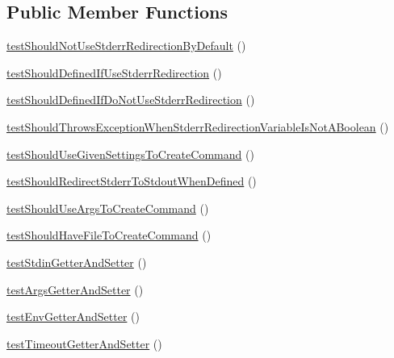 \subsection*{Public Member Functions}
\begin{DoxyCompactItemize}
\item 
\mbox{\hyperlink{class_p_h_p_unit___util___p_h_p_test_a3b801891e9faf40b0c27586909866e4a}{test\+Should\+Not\+Use\+Stderr\+Redirection\+By\+Default}} ()
\item 
\mbox{\hyperlink{class_p_h_p_unit___util___p_h_p_test_aea223b4d1c3665fe11f366b40d283409}{test\+Should\+Defined\+If\+Use\+Stderr\+Redirection}} ()
\item 
\mbox{\hyperlink{class_p_h_p_unit___util___p_h_p_test_ae2c3801c80392e94782d4aaeb6043c19}{test\+Should\+Defined\+If\+Do\+Not\+Use\+Stderr\+Redirection}} ()
\item 
\mbox{\hyperlink{class_p_h_p_unit___util___p_h_p_test_a65395e1f60ed9c20158851a3221cddc3}{test\+Should\+Throws\+Exception\+When\+Stderr\+Redirection\+Variable\+Is\+Not\+A\+Boolean}} ()
\item 
\mbox{\hyperlink{class_p_h_p_unit___util___p_h_p_test_ad56c6da33ad812176c407faaeffdc546}{test\+Should\+Use\+Given\+Settings\+To\+Create\+Command}} ()
\item 
\mbox{\hyperlink{class_p_h_p_unit___util___p_h_p_test_a25e6138b0aefb00f4d20332db2570a1a}{test\+Should\+Redirect\+Stderr\+To\+Stdout\+When\+Defined}} ()
\item 
\mbox{\hyperlink{class_p_h_p_unit___util___p_h_p_test_a722b0a91bd76acf208f1f6e796e6bf58}{test\+Should\+Use\+Args\+To\+Create\+Command}} ()
\item 
\mbox{\hyperlink{class_p_h_p_unit___util___p_h_p_test_a06d5c4b8b9087f973ab8dfe18413f7a5}{test\+Should\+Have\+File\+To\+Create\+Command}} ()
\item 
\mbox{\hyperlink{class_p_h_p_unit___util___p_h_p_test_a4b72001c3161f2940fa5c5e41e0dc106}{test\+Stdin\+Getter\+And\+Setter}} ()
\item 
\mbox{\hyperlink{class_p_h_p_unit___util___p_h_p_test_aa15e3dcd87bae69f6f8dc96b904fff8a}{test\+Args\+Getter\+And\+Setter}} ()
\item 
\mbox{\hyperlink{class_p_h_p_unit___util___p_h_p_test_ab15ecaf1339bc3e29a15e333116862c5}{test\+Env\+Getter\+And\+Setter}} ()
\item 
\mbox{\hyperlink{class_p_h_p_unit___util___p_h_p_test_a3b15593a3e2da9f40823c666349b1538}{test\+Timeout\+Getter\+And\+Setter}} ()
\end{DoxyCompactItemize}
